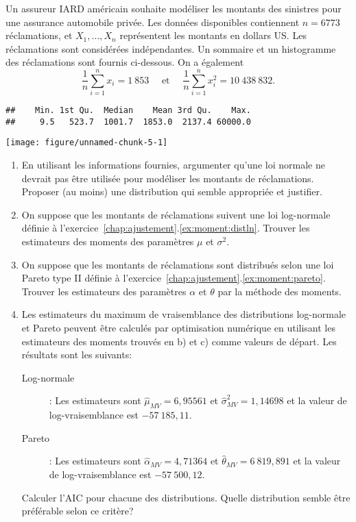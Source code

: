 
\begin{exercice}
Un assureur IARD américain souhaite modéliser les montants des sinistres pour une assurance automobile privée. Les données disponibles contiennent $n=6773$ réclamations, et $X_1,\ldots,X_n$ représentent les montants en dollars US. Les réclamations sont considérées indépendantes. Un sommaire et un histogramme des réclamations sont fournis ci-dessous. On a également
$$
\frac{1}{n}\sum_{i=1}^n x_i=1~853 \quad \mbox{ et }\quad \frac{1}{n}\sum_{i=1}^n x_i^2=10~438~832.
$$



\begin{knitrout}
\color{fgcolor}\begin{kframe}
\begin{alltt}
\end{alltt}
\begin{verbatim}
##    Min. 1st Qu.  Median    Mean 3rd Qu.    Max. 
##     9.5   523.7  1001.7  1853.0  2137.4 60000.0
\end{verbatim}
\end{kframe}
\texttt{[image: figure/unnamed-chunk-5-1]} 
\end{knitrout}


\begin{enumerate}
\item En utilisant les informations fournies, argumenter qu'une loi normale ne devrait pas être utilisée pour modéliser les montants de réclamations. Proposer (au moins) une distribution qui semble appropriée et justifier.

\item On suppose que les montants de réclamations suivent une loi log-normale définie à l'exercice~\ref{chap:ajustement}.\ref{ex:moment:distln}. Trouver les estimateurs des moments des paramètres $\mu$ et $\sigma^2$.

\item On suppose que les montants de réclamations sont distribués selon une loi Pareto type II définie à l'exercice~\ref{chap:ajustement}.\ref{ex:moment:pareto}. Trouver les estimateurs des paramètres $\alpha$ et $\theta$ par la méthode des moments.

\item Les estimateurs du maximum de vraisemblance des distributions log-normale et Pareto peuvent être calculés par optimisation numérique en utilisant les estimateurs des moments trouvés en b) et c) comme valeurs de départ. Les résultats sont les suivants:
\begin{description}
\item[Log-normale]: Les estimateurs sont $\hat\mu_{MV}=6,95561$ et $\hat\sigma^2_{MV}=1,14698$ et la valeur de log-vraisemblance est $-57~185,11$.
\item[Pareto]: Les estimateurs sont $\hat\alpha_{MV}=4,71364$ et $\hat\theta_{MV}=6~819,891$ et la valeur de log-vraisemblance est $-57~500,12$.
\end{description}
Calculer l'AIC pour chacune des distributions. Quelle distribution semble être préférable selon ce critère?


\end{enumerate}
\end{exercice}
